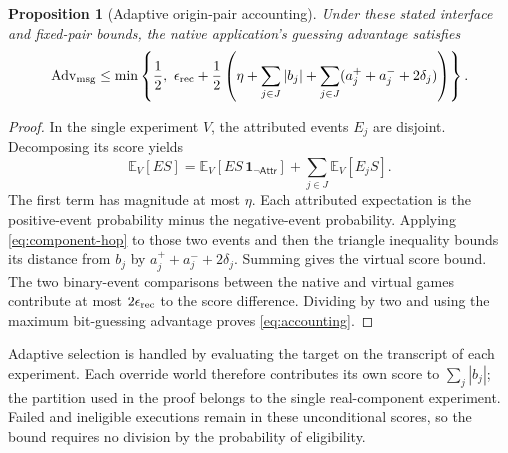 \documentclass[pdflatex]{sn-jnl}
\theoremstyle{thmstyleone}
\newtheorem{proposition}[theorem]{Proposition}
\theoremstyle{thmstylethree}
\theoremstyle{thmstyletwo}
\begin{document}
\begin{proposition}[Adaptive origin-pair accounting]
\label{prop:adaptive-accounting}
Under these stated interface and fixed-pair bounds, the native application's
guessing advantage satisfies
\begin{equation}
\operatorname{Adv}_{\rm msg}
 \leq \min\left\{\frac12,\
 \epsilon_{\rm rec}+\frac12
 \left(\eta+\sum_{j\in J}|b_j|
       +\sum_{j\in J}(a_j^{+}+a_j^{-}+2\delta_j)\right)\right\}.
\label{eq:accounting}
\end{equation}
\end{proposition}
\begin{proof}
In the single experiment $V$, the attributed events $E_j$ are disjoint.
Decomposing its score yields
\[
 \mathbb E_V[ES]
 =\mathbb E_V[ES\,\mathbf1_{\neg\mathsf{Attr}}]
   +\sum_{j\in J}\mathbb E_V[E_jS].
\]
The first term has magnitude at most $\eta$. Each attributed expectation is the
positive-event probability minus the negative-event probability. Applying
\eqref{eq:component-hop} to those two events and then the triangle inequality
bounds its distance from $b_j$ by
$a_j^++a_j^-+2\delta_j$. Summing gives the virtual score bound.
The two binary-event comparisons between the native and virtual games contribute at most
$2\epsilon_{\rm rec}$ to the score difference. Dividing by two and using the
maximum bit-guessing advantage proves \eqref{eq:accounting}.
\end{proof}

Adaptive selection is handled by evaluating the target on the transcript
of each experiment. Each override world therefore contributes its own
score to $\sum_j|b_j|$; the partition used in the proof belongs to the
single real-component experiment. Failed and ineligible executions remain
in these unconditional scores, so the bound requires no division by the
probability of eligibility.
\end{document}

